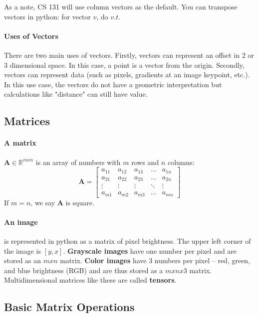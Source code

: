 \documentclass{article}
\begin{document}
As a note, CS 131 will use column vectors as the default. You can transpose vectors in python: for vector $v$, do $v.t$.

\paragraph{Uses of Vectors} There are two main uses of vectors. Firstly, vectors can represent an offset in 2 or 3 dimensional space. In this case, a point is a vector from the origin. Secondly, vectors can represent data (such as pixels, gradients at an image keypoint, etc.). In this use case, the vectors do not have a geometric interpretation but calculations like "distance" can still have value.

\subsection{Matrices}
\paragraph{A matrix} $\textbf{A} \in \mathbb{R}^{mxn}$ is an array of numbers with $m$ rows and $n$ columns:
\[\textbf{A} = \begin{bmatrix}
    a_{11} & a_{12} & a_{13} & \dots  & a_{1n} \\
    a_{21} & a_{22} & a_{23} & \dots  & a_{2n} \\
    \vdots & \vdots & \vdots & \ddots & \vdots \\
    a_{m1} & a_{m2} & a_{m3} & \dots  & a_{mn}
\end{bmatrix}\]
If $m=n$, we say $\textbf{A}$ is square.

\paragraph{An image} is represented in python as a matrix of pixel brightness. The upper left corner of the image is $[y,x]$. \textbf{Grayscale images} have one number per pixel and are stored as an $mxn$ matrix. \textbf{Color images} have 3 numbers per pixel -- red, green, and blue brightness (RGB) and are thus stored as a $mxnx3$ matrix. Multidimensional matrices like these are called \textbf{tensors}.

\subsection{Basic Matrix Operations}
\end{document}
